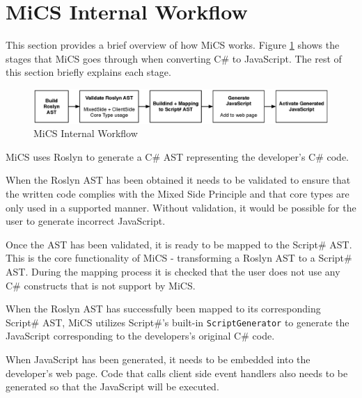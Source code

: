 \section{MiCS Internal Workflow} %
\label{sec:workflow_overview}

This section provides a brief overview of how MiCS works. Figure \ref{fig:mics_internal_workflow} shows the stages that MiCS goes through when converting C\# to JavaScript. The rest of this section briefly explains each stage.

\begin{figure}[H]
	\begin{center}
		\centerline{\includegraphics[width=18cm]{resources/images/internalworkflow.eps}}
	\end{center}
	\caption{MiCS Internal Workflow}
	\label{fig:mics_internal_workflow}
\end{figure}

MiCS uses Roslyn to generate a C\# AST representing the developer's  C\# code. 

When the Roslyn AST has been obtained it needs to be validated to ensure that the written code complies with the Mixed Side Principle and that core types are only used in a supported manner. Without validation, it would be possible for the user to generate incorrect JavaScript.

Once the AST has been validated, it is ready to be mapped to the Script\# AST. This is the core functionality of MiCS - transforming a Roslyn AST to a Script\# AST. During the mapping process it is checked that the user does not use any C\# constructs that is not support by MiCS. 

When the Roslyn AST has successfully been mapped to its corresponding Script\# AST, MiCS utilizes Script\#’s built-in \texttt{ScriptGenerator} to generate the JavaScript corresponding to the developers’s original C\# code. 

When JavaScript has been generated, it needs to be embedded into the developer’s web page. Code that calls client side event handlers also needs to be generated so that the JavaScript will be executed.


